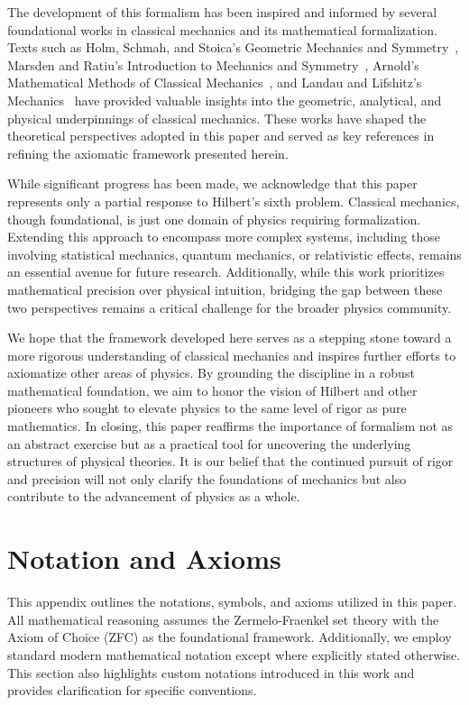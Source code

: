\documentclass[12pt]{amsart}
\begin{document}
The development of this formalism has been inspired and informed by several foundational works in classical mechanics and its mathematical formalization. Texts such as Holm, Schmah, and Stoica's Geometric Mechanics and Symmetry~\cite{holm2009geometric}, Marsden and Ratiu's Introduction to Mechanics and Symmetry~\cite{marsden1999introduction}, Arnold's Mathematical Methods of Classical Mechanics~\cite{arnold1989mathematical}, and Landau and Lifshitz's Mechanics~\cite{landau1976mechanics} have provided valuable insights into the geometric, analytical, and physical underpinnings of classical mechanics. These works have shaped the theoretical perspectives adopted in this paper and served as key references in refining the axiomatic framework presented herein.

While significant progress has been made, we acknowledge that this paper represents only a partial response to Hilbert's sixth problem. Classical mechanics, though foundational, is just one domain of physics requiring formalization. Extending this approach to encompass more complex systems, including those involving statistical mechanics, quantum mechanics, or relativistic effects, remains an essential avenue for future research. Additionally, while this work prioritizes mathematical precision over physical intuition, bridging the gap between these two perspectives remains a critical challenge for the broader physics community.

We hope that the framework developed here serves as a stepping stone toward a more rigorous understanding of classical mechanics and inspires further efforts to axiomatize other areas of physics. By grounding the discipline in a robust mathematical foundation, we aim to honor the vision of Hilbert and other pioneers who sought to elevate physics to the same level of rigor as pure mathematics. In closing, this paper reaffirms the importance of formalism not as an abstract exercise but as a practical tool for uncovering the underlying structures of physical theories. It is our belief that the continued pursuit of rigor and precision will not only clarify the foundations of mechanics but also contribute to the advancement of physics as a whole.


\newpage
\appendix

\section{Notation and Axioms}

This appendix outlines the notations, symbols, and axioms utilized in this paper. All mathematical reasoning assumes the Zermelo-Fraenkel set theory with the Axiom of Choice (ZFC) as the foundational framework. Additionally, we employ standard modern mathematical notation except where explicitly stated otherwise. This section also highlights custom notations introduced in this work and provides clarification for specific conventions.
\end{document}
